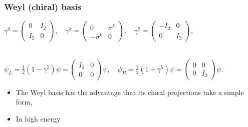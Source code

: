 \begin{frame}\frametitle{ Weyl (chiral) basis }
% 


$\gamma ^{0}={\begin{pmatrix}0&I_{2}\\I_{2}&0\end{pmatrix}},\quad \gamma ^{k}={\begin{pmatrix}0&\sigma ^{k}\\-\sigma ^{k}&0\end{pmatrix}},\quad \gamma ^{5}={\begin{pmatrix}-I_{2}&0\\0&I_{2}\end{pmatrix}},$

\\

${\displaystyle \psi _{L}={\frac {1}{2}}\left(1-\gamma ^{5}\right)\psi ={\begin{pmatrix}I_{2}&0\\0&0\end{pmatrix}}\psi ,\quad \psi _{R}={\frac {1}{2}}\left(1+\gamma ^{5}\right)\psi ={\begin{pmatrix}0&0\\0&I_{2}\end{pmatrix}}\psi .}$


\begin{itemize}
 \item  The Weyl basis has the advantage that its chiral projections take a simple form,
 \item In high energy
\end{itemize}



\end{frame}
